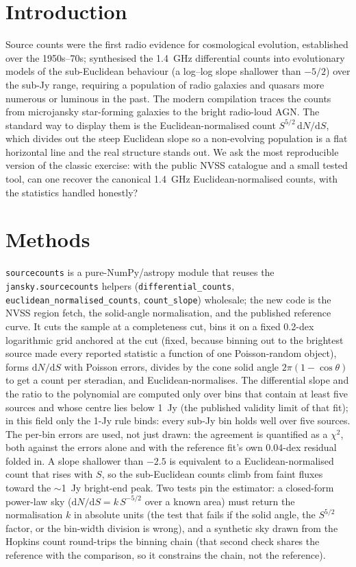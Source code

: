 \documentclass[twocolumn]{aastex631}
\newcommand{\code}[1]{\texttt{#1}}
\begin{document}
\section{Introduction}
Source counts were the first radio evidence for cosmological evolution, established over the
1950s--70s; \citet{condon1984} synthesised the 1.4~GHz differential counts into evolutionary
models of the sub-Euclidean behaviour (a log--log slope shallower than $-5/2$) over the sub-Jy
range, requiring a population of radio galaxies and quasars more numerous or luminous in the
past. The modern compilation \citep{dezotti2010} traces the counts from microjansky star-forming
galaxies to the bright radio-loud AGN. The standard way to display them is the
Euclidean-normalised count $S^{5/2}\,\mathrm{d}N/\mathrm{d}S$, which divides out the steep
Euclidean slope so a non-evolving population is a flat horizontal line and the real structure stands
out. We ask the most reproducible version of the classic exercise: with the public NVSS catalogue and a
small tested tool, can one recover the canonical 1.4~GHz Euclidean-normalised counts, with the
statistics handled honestly?

\section{Methods}
\code{sourcecounts} is a pure-NumPy/astropy module that reuses the \code{jansky.sourcecounts} helpers
(\code{differential\_counts}, \code{euclidean\_normalised\_counts}, \code{count\_slope}) wholesale; the
new code is the NVSS region fetch, the solid-angle normalisation, and the published reference curve. It
cuts the sample at a completeness cut, bins it on a fixed 0.2-dex logarithmic grid anchored at
the cut (fixed, because binning out to the brightest source made every reported statistic a
function of one Poisson-random object), forms $\mathrm{d}N/\mathrm{d}S$ with Poisson errors,
divides by the cone solid angle $2\pi(1-\cos\theta)$ to get a count per steradian, and
Euclidean-normalises. The differential slope and the ratio to the \citet{hopkins2003} polynomial
are computed only over bins that contain at least five sources and whose centre lies below 1~Jy
(the published validity limit of that fit); in this field only the 1-Jy rule binds: every
sub-Jy bin holds well over five sources. The per-bin errors are used, not just drawn: the
agreement is quantified as a $\chi^2$, both against the errors alone and with the reference
fit's own 0.04-dex residual folded in. A slope shallower than $-2.5$ is equivalent to a
Euclidean-normalised count that rises with $S$, so the sub-Euclidean counts climb from faint
fluxes toward the $\sim$1~Jy bright-end peak. Two tests pin the estimator: a closed-form
power-law sky ($\mathrm{d}N/\mathrm{d}S = k\,S^{-5/2}$ over a known area) must return the
normalisation $k$ in absolute units (the test that fails if the solid angle, the $S^{5/2}$
factor, or the bin-width division is wrong), and a synthetic sky drawn from the Hopkins count
round-trips the binning chain (that second check shares the reference with the comparison, so it
constrains the chain, not the reference).
\end{document}

